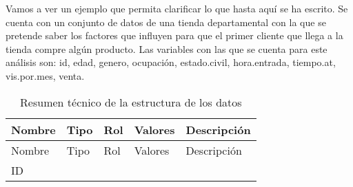 \documentclass[]{book}
\begin{document}
Vamos a ver un ejemplo que permita clarificar lo que hasta aquí se ha
escrito. Se cuenta con un conjunto de datos de una tienda departamental
con la que se pretende saber los factores que influyen para que el
primer cliente que llega a la tienda compre algún producto. Las
variables con las que se cuenta para este análisis son: id, edad,
genero, ocupación, estado.civil, hora.entrada, tiempo.at, vis.por.mes,
venta.

\begin{longtable}[]{@{}lllll@{}}
\caption{\label{tab:estructura-de-datos} Resumen técnico de la estructura de
los datos}\tabularnewline
\toprule
\begin{minipage}[b]{0.06\columnwidth}\raggedright\strut
Nombre\strut
\end{minipage} & \begin{minipage}[b]{0.06\columnwidth}\raggedright\strut
Tipo\strut
\end{minipage} & \begin{minipage}[b]{0.06\columnwidth}\raggedright\strut
Rol\strut
\end{minipage} & \begin{minipage}[b]{0.42\columnwidth}\raggedright\strut
Valores\strut
\end{minipage} & \begin{minipage}[b]{0.27\columnwidth}\raggedright\strut
Descripción\strut
\end{minipage}\tabularnewline
\midrule
\endfirsthead
\toprule
\begin{minipage}[b]{0.06\columnwidth}\raggedright\strut
Nombre\strut
\end{minipage} & \begin{minipage}[b]{0.06\columnwidth}\raggedright\strut
Tipo\strut
\end{minipage} & \begin{minipage}[b]{0.06\columnwidth}\raggedright\strut
Rol\strut
\end{minipage} & \begin{minipage}[b]{0.42\columnwidth}\raggedright\strut
Valores\strut
\end{minipage} & \begin{minipage}[b]{0.27\columnwidth}\raggedright\strut
Descripción\strut
\end{minipage}\tabularnewline
\midrule
\endhead
\begin{minipage}[t]{0.06\columnwidth}\raggedright\strut
ID\strut
\end{minipage} & \begin{minipage}[t]{0.06\columnwidth}\raggedright\strut

\end{minipage}
\end{longtable}
\end{document}
